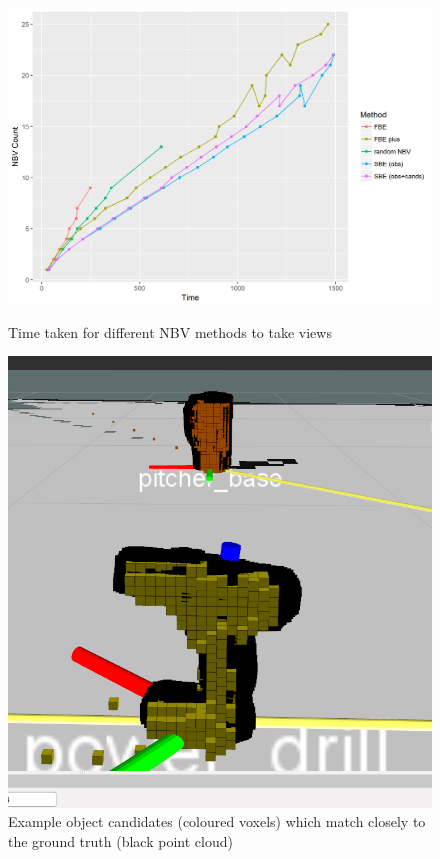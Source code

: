 \begin{figure}
	\centering
	\begin{minipage}{0.5\linewidth}
		\centering
		\includegraphics[width=0.8\linewidth]{src/Plots/nbv_count_vs_time.png}
		\caption{Time taken for different NBV methods to take views}
	\end{minipage}%
	\begin{minipage}{0.5\linewidth}
		\centering
		\includegraphics[width=0.5\linewidth]{src/drill2.png}
		\caption{Example object candidates (coloured voxels) which match closely to the ground truth (black point cloud)}
	\end{minipage}
\end{figure}